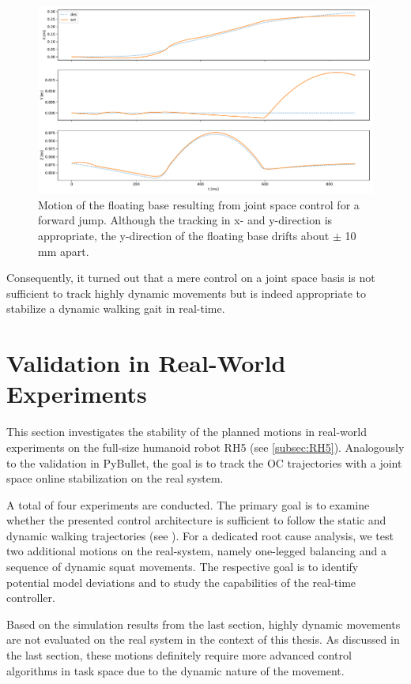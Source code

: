 \begin{figure}
\centering	
\includegraphics[width=.85\textwidth]{fig/jumpForward/pybullet/pybulletBase}
\caption[Motion of the floating base for a forward jump]{Motion of the floating base resulting from joint space control for a forward jump. Although the tracking in x- and y-direction is appropriate, the y-direction of the floating base drifts about $\pm$ 10 \nolinebreak mm apart.}
\label{fig:jumpForward_pybulletBase}
\end{figure}

Consequently, it turned out that a mere control on a joint space basis is not sufficient to track highly dynamic movements but is indeed appropriate to stabilize a dynamic walking gait in real-time. 


\section{Validation in Real-World Experiments}\label{sec:OnlineExperiments}
This section investigates the stability of the planned motions in real-world experiments on the full-size humanoid robot RH5 (see \cref{subsec:RH5}). Analogously to the validation in PyBullet, the goal is to track the \gls{OC} trajectories with a joint space online stabilization on the real system. 

A total of four experiments are conducted. The primary goal is to examine whether the presented control architecture is sufficient to follow the static and dynamic walking trajectories (see ). For a dedicated root cause analysis, we test two additional motions on the real-system, namely one-legged balancing and a sequence of dynamic squat movements. The respective goal is to identify potential model deviations and to study the capabilities of the real-time controller.

Based on the simulation results from the last section, highly dynamic movements are not evaluated on the real system in the context of this thesis. As discussed in the last section, these motions definitely require more advanced control algorithms in task space due to the dynamic nature of the movement. 

